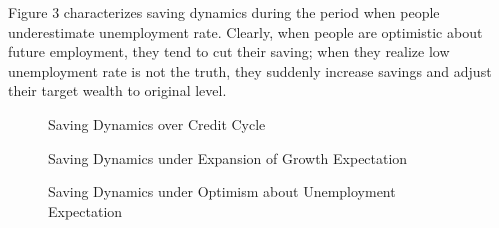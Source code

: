 \documentclass[titlepage,abstract,letterpaper]{bejournal}
\begin{document}
\begin{enumerate}
Figure 3 characterizes saving dynamics during the period when people underestimate unemployment rate. Clearly, when people are optimistic about future employment, they tend to cut their saving; when they realize low unemployment rate is not the truth, they suddenly increase savings and adjust their target wealth to original level.
\end{enumerate}


\begin{figure}
\caption{Saving Dynamics over Credit Cycle}

\caption{Saving Dynamics under Expansion of Growth Expectation}
\end{figure}
\begin{figure}
\caption{Saving Dynamics under Optimism about Unemployment Expectation}
\end{figure}


\end{document}
